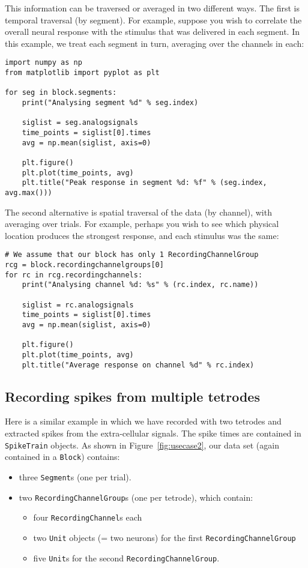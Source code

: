 \documentclass{frontiers}
\begin{document}
This information can be traversed or averaged in two different ways. The first is temporal traversal (by segment). For example, suppose you wish to correlate the overall neural response with the stimulus that was delivered in each segment. In this example, we treat each segment in turn, averaging over the channels in each:

\begin{lstlisting}[style=display]
import numpy as np
from matplotlib import pyplot as plt

for seg in block.segments:
    print("Analysing segment %d" % seg.index)

    siglist = seg.analogsignals
    time_points = siglist[0].times
    avg = np.mean(siglist, axis=0)

    plt.figure()
    plt.plot(time_points, avg)
    plt.title("Peak response in segment %d: %f" % (seg.index, avg.max()))
\end{lstlisting}

The second alternative is spatial traversal of the data (by channel), with averaging over trials. For example, perhaps you wish to see which physical location produces the strongest response, and each stimulus was the same:

\begin{lstlisting}[style=display]
# We assume that our block has only 1 RecordingChannelGroup
rcg = block.recordingchannelgroups[0]
for rc in rcg.recordingchannels:
    print("Analysing channel %d: %s" % (rc.index, rc.name))

    siglist = rc.analogsignals
    time_points = siglist[0].times
    avg = np.mean(siglist, axis=0)

    plt.figure()
    plt.plot(time_points, avg)
    plt.title("Average response on channel %d" % rc.index)
\end{lstlisting}


\subsection{Recording spikes from multiple tetrodes}

Here is a similar example in which we have recorded with two tetrodes and extracted spikes from the extra-cellular signals. The spike times are contained in \lstinline`SpikeTrain` objects. As shown in Figure~\ref{fig:usecase2}, our data set (again contained in a \lstinline`Block`) contains:

\begin{itemize}
\item three \lstinline`Segment`s (one per trial).
\item two \lstinline`RecordingChannelGroup`s (one per tetrode), which contain:
  \begin{itemize}
  \item four \lstinline`RecordingChannel`s each
  \item two \lstinline`Unit` objects (= two neurons) for the first \lstinline`RecordingChannelGroup`
  \item five \lstinline`Unit`s for the second \lstinline`RecordingChannelGroup`.
  \end{itemize}
\end{itemize}
\end{document}
